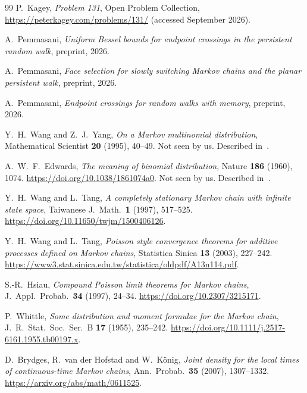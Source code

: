 \documentclass[11pt]{article}
\theoremstyle{definition}
\theoremstyle{remark}
\begin{document}
\appendix





\begin{thebibliography}{99}
P.~Kagey, \emph{Problem 131}, Open Problem Collection,
\url{https://peterkagey.com/problems/131/} (accessed September 2026).

A.~Pemmasani, \emph{Uniform Bessel bounds for endpoint crossings in the
persistent random walk}, preprint, 2026.

A.~Pemmasani, \emph{Face selection for slowly switching Markov chains and the
planar persistent walk}, preprint, 2026.

A.~Pemmasani, \emph{Endpoint crossings for random walks with memory},
preprint, 2026.

Y.~H.~Wang and Z.~J.~Yang, \emph{On a Markov multinomial distribution},
Mathematical Scientist \textbf{20} (1995), 40--49. Not seen by us. Described
in~\cite{wangtang1997,wangtang2003}.

A.~W.~F.~Edwards, \emph{The meaning of binomial distribution}, Nature
\textbf{186} (1960), 1074. \url{https://doi.org/10.1038/1861074a0}. Not seen
by us. Described in~\cite{wangtang1997,wangtang2003}.

Y.~H.~Wang and L.~Tang, \emph{A completely stationary Markov chain with
infinite state space}, Taiwanese J.~Math.~\textbf{1} (1997), 517--525.
\url{https://doi.org/10.11650/twjm/1500406126}.

Y.~H.~Wang and L.~Tang, \emph{Poisson style convergence theorems for
additive processes defined on Markov chains},
Statistica Sinica \textbf{13} (2003), 227--242.
\url{https://www3.stat.sinica.edu.tw/statistica/oldpdf/A13n114.pdf}.

S.-R.~Hsiau, \emph{Compound Poisson limit theorems for Markov chains},
J.~Appl.~Probab.~\textbf{34} (1997), 24--34.
\url{https://doi.org/10.2307/3215171}.

P.~Whittle, \emph{Some distribution and moment formulae for the Markov
chain}, J.\ R.\ Stat.\ Soc.\ Ser.~B \textbf{17} (1955), 235--242.
\url{https://doi.org/10.1111/j.2517-6161.1955.tb00197.x}.

D.~Brydges, R.~van der Hofstad and W.~K\"onig,
\emph{Joint density for the local times of continuous-time Markov chains},
Ann.~Probab.~\textbf{35} (2007), 1307--1332.
\url{https://arxiv.org/abs/math/0611525}.


\end{thebibliography}
\end{document}
